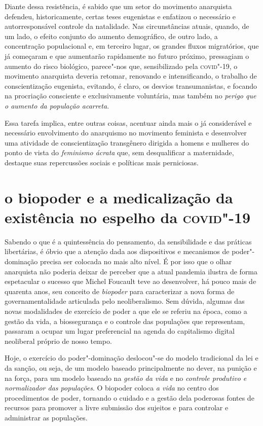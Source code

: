 Diante dessa resistência, é sabido que um setor do movimento anarquista
defendeu, historicamente, certas teses eugenistas e enfatizou o
necessário e autorresponsável controle da natalidade. Nas circunstâncias
atuais, quando, de um lado, o efeito conjunto do aumento demográfico, de
outro lado, a concentração populacional e, em terceiro lugar, os grandes
fluxos migratórios, que já começaram e que aumentarão rapidamente no
futuro próximo, pressagiam o aumento do risco biológico, parece"-nos que,
sensibilizado pela \textsc{covid}"-19, o movimento anarquista deveria retomar,
renovando e intensificando, o trabalho de conscientização eugenista,
evitando, é claro, os desvios transumanistas, e focando na procriação
consciente e exclusivamente voluntária, mas também no \textit{perigo que
o aumento da população acarreta}.

Essa tarefa implica, entre outras coisas, acentuar ainda mais o já
considerável e necessário envolvimento do anarquismo no movimento
feminista e desenvolver uma atividade de conscientização transgênero
dirigida a homens e mulheres do ponto de vista do \textit{feminismo
ácrata} que, sem desqualificar a maternidade, destaque suas repercussões
sociais e políticas mais perniciosas.

\section{o biopoder e a medicalização da existência no espelho da
\textsc{covid}"-19}

Sabendo o que é a quintessência do pensamento, da sensibilidade e das
práticas libertárias, é óbvio que a atenção dada aos dispositivos e
mecanismos de poder"-dominação precisa ser colocada no mais alto nível. É
por isso que o olhar anarquista não poderia deixar de perceber que a
atual pandemia ilustra de forma espetacular o sucesso que Michel
Foucault teve ao desenvolver, há pouco mais de quarenta anos, seu
conceito de \textit{biopoder} para caracterizar a nova forma de
governamentalidade articulada pelo neoliberalismo. Sem dúvida, algumas
das novas modalidades de exercício de poder a que ele se referiu na
época, como a gestão da vida, a biossegurança e o controle das
populações que representam, passaram a ocupar um lugar preferencial na
agenda do capitalismo digital neoliberal próprio de nosso tempo.

Hoje, o exercício do poder"-dominação deslocou"-se do modelo tradicional
da lei e da sanção, ou seja, de um modelo baseado principalmente no
dever, na punição e na força, para um modelo baseado na \textit{gestão
da vida} e no \textit{controle produtivo e normalizador das populações}.
O biopoder coloca \textit{a vida} no centro dos procedimentos de poder,
tornando o cuidado e a gestão dela poderosas fontes de recursos para
promover a livre submissão dos sujeitos e para controlar e administrar
as populações.


